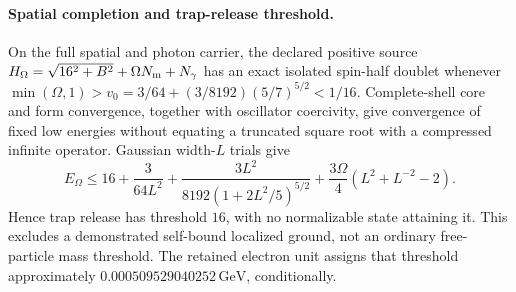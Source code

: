 \paragraph{Spatial completion and trap-release threshold.}
On the full spatial and photon carrier, the declared positive source
$H_\Omega=\sqrt{16^2+B^2}+\Omega N_{\rm m}+N_\gamma$ has an exact isolated
spin-half doublet whenever
$\min(\Omega,1)>v_0=3/64+(3/8192)(5/7)^{5/2}<1/16$.
Complete-shell core and form convergence, together with oscillator
coercivity, give convergence of fixed low energies without equating a
truncated square root with a compressed infinite operator.
Gaussian width-$L$ trials give
\[
E_\Omega\leq16+\frac3{64L^2}
 +\frac{3L^2}{8192(1+2L^2/5)^{5/2}}
 +\frac{3\Omega}{4}(L^2+L^{-2}-2).
\]
Hence trap release has threshold $16$, with no normalizable state attaining
it. This excludes a demonstrated self-bound localized ground, not an ordinary
free-particle mass threshold. The retained electron unit assigns that
threshold approximately $0.000509529040252\,\mathrm{GeV}$, conditionally.
